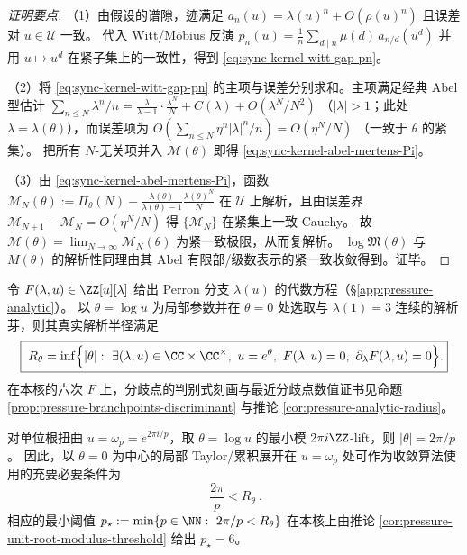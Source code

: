 \begin{proof}[证明要点]
（1）由假设的谱隙，迹满足
\(
a_n(u)=\lambda(u)^n+O(\rho(u)^n)
\)
且误差对 \(u\in\mathcal U\) 一致。
代入 Witt/Möbius 反演
\(
p_n(u)=\frac{1}{n}\sum_{d\mid n}\mu(d)\,a_{n/d}(u^d)
\)
并用 \(u\mapsto u^d\) 在紧子集上的一致性，得到 \eqref{eq:sync-kernel-witt-gap-pn}。
\par
（2）将 \eqref{eq:sync-kernel-witt-gap-pn} 的主项与误差分别求和。主项满足经典 Abel 型估计
\(
\sum_{n\le N}\lambda^n/n
=
\frac{\lambda}{\lambda-1}\cdot\frac{\lambda^N}{N}+C(\lambda)+O(\lambda^N/N^2)
\)
（\(|\lambda|>1\)；此处 \(\lambda=\lambda(\theta)\)），而误差项为
\(
O(\sum_{n\le N}\eta^n|\lambda|^n/n)=O(\eta^N/N)
\)
（一致于 \(\theta\) 的紧集）。
把所有 \(N\)-无关项并入 \(\mathcal M(\theta)\) 即得 \eqref{eq:sync-kernel-abel-mertens-Pi}。
\par
（3）由 \eqref{eq:sync-kernel-abel-mertens-Pi}，函数
\(
\mathcal M_N(\theta):=\Pi_\theta(N)-\frac{\lambda(\theta)}{\lambda(\theta)-1}\frac{\lambda(\theta)^N}{N}
\)
在 \(\mathcal U\) 上解析，且由误差界 \(\mathcal M_{N+1}-\mathcal M_N=O(\eta^N/N)\) 得
\(\{\mathcal M_N\}\) 在紧集上一致 Cauchy。
故 \(\mathcal M(\theta)=\lim_{N\to\infty}\mathcal M_N(\theta)\) 为紧一致极限，从而复解析。
\(\log\mathfrak{M}(\theta)\) 与 \(M(\theta)\) 的解析性同理由其 Abel 有限部/级数表示的紧一致收敛得到。证毕。
\end{proof}

\begin{corollary}\label{cor:sync-kernel-analytic-radius-discriminant-formula}
令 \(F(\lambda,u)\in\ZZ[u][\lambda]\) 给出 Perron 分支 \(\lambda(u)\) 的代数方程（\S\ref{app:pressure-analytic}）。
以 \(\theta=\log u\) 为局部参数并在 \(\theta=0\) 处选取与 \(\lambda(1)=3\) 连续的解析芽，则其真实解析半径满足
\[
\boxed{\;
R_\theta=\inf\Bigl\{|\theta|:\ \exists(\lambda,u)\in\CC\times\CC^\times,\ u=e^\theta,\ F(\lambda,u)=0,\ \partial_\lambda F(\lambda,u)=0\Bigr\}.}
\]
在本核的六次 \(F\) 上，分歧点的判别式刻画与最近分歧点数值证书见命题 \ref{prop:pressure-branchpoints-discriminant} 与推论 \ref{cor:pressure-analytic-radius}。
\end{corollary}

\begin{corollary}\label{cor:sync-kernel-unit-root-twist-threshold}
对单位根扭曲 \(u=\omega_p=e^{2\pi i/p}\)，取 \(\theta=\log u\) 的最小模 \(2\pi i\ZZ\)-lift，则 \(|\theta|=2\pi/p\)。
因此，以 \(\theta=0\) 为中心的局部 Taylor/累积展开在 \(u=\omega_p\) 处可作为收敛算法使用的充要必要条件为
\[
\boxed{\ \frac{2\pi}{p}<R_\theta\ }.
\]
相应的最小阈值
\(
p_\star:=\min\{p\in\NN:\ 2\pi/p<R_\theta\}
\)
在本核上由推论 \ref{cor:pressure-unit-root-modulus-threshold} 给出 \(p_\star=6\)。
\end{corollary}

